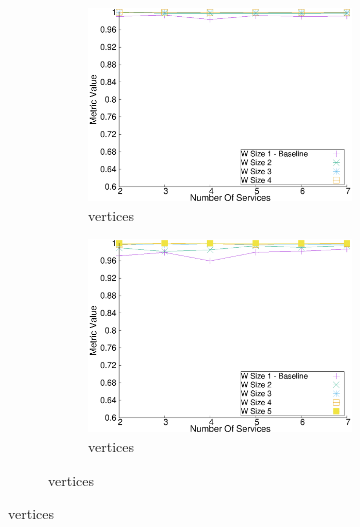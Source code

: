 \begin{figure}[H]
\begin{adjustbox}{minipage=\linewidth,scale=0.75}
\begin{subfigure}{0.45\textwidth}
      \begin{subfigure}{\textwidth}
        \includegraphics[width=\textwidth]{Images/graphs/window_quality_performance_diff_qual_n7_s7_50_80_n4}
        \caption{ vertices}
        \label{fig:quality_window_average_qualitative_n4}
      \end{subfigure}
      \begin{subfigure}{\textwidth}
        \includegraphics[width=\textwidth]{Images/graphs/window_quality_performance_diff_qual_n7_s7_50_80_n5}
        \caption{ vertices}
        \label{fig:quality_window_average_qualitative_n5}
      \end{subfigure}


\end{subfigure}
\end{adjustbox}
\end{figure}
